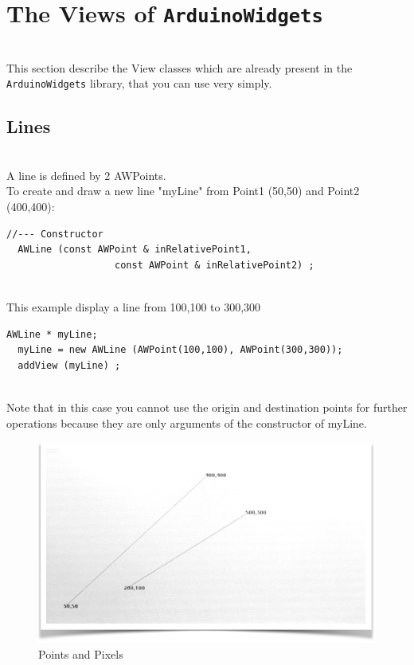 \documentclass[a4paper,11pt]{extarticle}
\begin{document}
\newpage
\section{The Views of \texttt{ArduinoWidgets}}

~\\ This section describe the View classes which are already present in the \texttt{ArduinoWidgets} library, that you can use very simply.
\subsection{Lines}

~\\ A line is defined by 2 AWPoints. 
~\\ To create and draw a new line "myLine" from Point1 (50,50) and Point2 (400,400):

\begin{lstlisting}[language=Arduinonl]
//--- Constructor
  AWLine (const AWPoint & inRelativePoint1,
                   const AWPoint & inRelativePoint2) ;
 \end{lstlisting}

~\\ This example display a line from 100,100 to 300,300

\begin{lstlisting}[language=Arduinonl]
AWLine * myLine;
  myLine = new AWLine (AWPoint(100,100), AWPoint(300,300)); 
  addView (myLine) ;
 \end{lstlisting}
~\\ Note that in this case you cannot use the origin and destination points for further operations because they are only arguments of the constructor of myLine.

\begin{figure}[htbp]
   \centering
   \includegraphics[scale=0.7]{AWFig4.png} 
   \caption{Points and Pixels}
   \label{fig:4 }
\end{figure}
\end{document}
